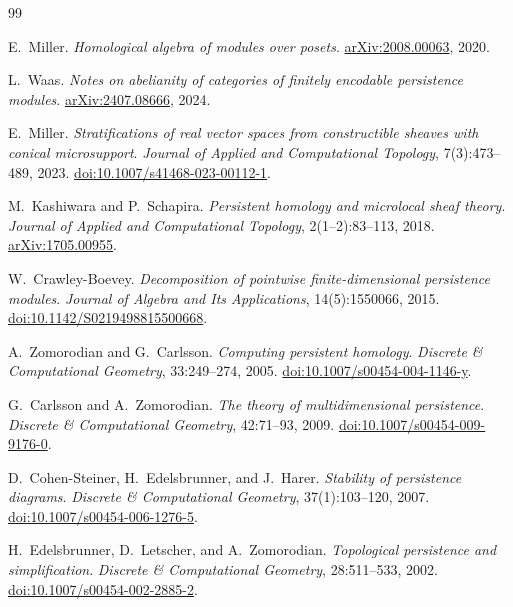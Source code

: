 \documentclass[11pt]{article}
\theoremstyle{definition}
\theoremstyle{remark}
\begin{document}
\begin{thebibliography}{99}

E.~Miller.
\newblock \emph{Homological algebra of modules over posets}.
\newblock \href{https://arxiv.org/abs/2008.00063}{arXiv:2008.00063}, 2020.

L.~Waas.
\newblock \emph{Notes on abelianity of categories of finitely encodable persistence modules}.
\newblock \href{https://arxiv.org/abs/2407.08666}{arXiv:2407.08666}, 2024.

E.~Miller.
\newblock \emph{Stratifications of real vector spaces from constructible sheaves with conical microsupport}.
\newblock \emph{Journal of Applied and Computational Topology}, 7(3):473--489, 2023.
\newblock \href{https://doi.org/10.1007/s41468-023-00112-1}{doi:10.1007/s41468-023-00112-1}.

M.~Kashiwara and P.~Schapira.
\newblock \emph{Persistent homology and microlocal sheaf theory}.
\newblock \emph{Journal of Applied and Computational Topology}, 2(1--2):83--113, 2018.
\newblock \href{https://arxiv.org/abs/1705.00955}{arXiv:1705.00955}.

W.~Crawley-Boevey.
\newblock \emph{Decomposition of pointwise finite-dimensional persistence modules}.
\newblock \emph{Journal of Algebra and Its Applications}, 14(5):1550066, 2015.
\newblock \href{https://doi.org/10.1142/S0219498815500668}{doi:10.1142/S0219498815500668}.

A.~Zomorodian and G.~Carlsson.
\newblock \emph{Computing persistent homology}.
\newblock \emph{Discrete \& Computational Geometry}, 33:249--274, 2005.
\newblock \href{https://doi.org/10.1007/s00454-004-1146-y}{doi:10.1007/s00454-004-1146-y}.

G.~Carlsson and A.~Zomorodian.
\newblock \emph{The theory of multidimensional persistence}.
\newblock \emph{Discrete \& Computational Geometry}, 42:71--93, 2009.
\newblock \href{https://doi.org/10.1007/s00454-009-9176-0}{doi:10.1007/s00454-009-9176-0}.

D.~Cohen-Steiner, H.~Edelsbrunner, and J.~Harer.
\newblock \emph{Stability of persistence diagrams}.
\newblock \emph{Discrete \& Computational Geometry}, 37(1):103--120, 2007.
\newblock \href{https://doi.org/10.1007/s00454-006-1276-5}{doi:10.1007/s00454-006-1276-5}.

H.~Edelsbrunner, D.~Letscher, and A.~Zomorodian.
\newblock \emph{Topological persistence and simplification}.
\newblock \emph{Discrete \& Computational Geometry}, 28:511--533, 2002.
\newblock \href{https://doi.org/10.1007/s00454-002-2885-2}{doi:10.1007/s00454-002-2885-2}.


\end{thebibliography}
\end{document}
